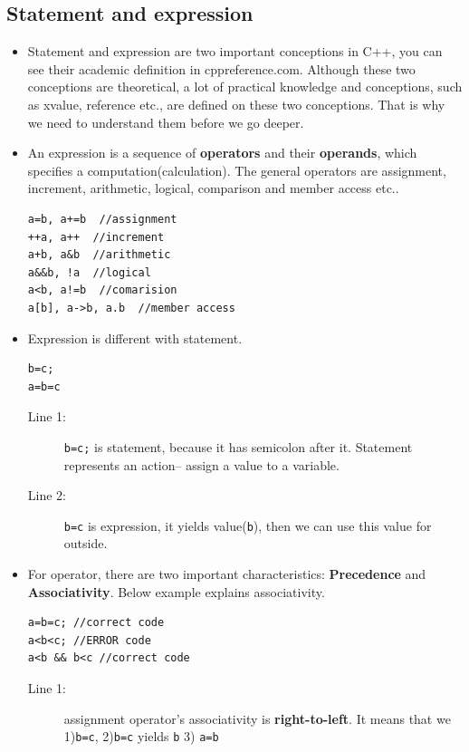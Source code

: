 \documentclass[a4paper,11pt,twoside]{book}
\begin{document}
\subsection{Statement and expression}
\begin{itemize}
	\item Statement and expression are two important conceptions in C++, you can see their academic definition in cppreference.com. Although these two conceptions are theoretical, a lot of practical knowledge and conceptions, such as xvalue, reference etc., are defined on these two conceptions. That is why we need to understand them before we go deeper. 
	
	\item An expression is a sequence of \textbf{operators} and their \textbf{operands}, which specifies a computation(calculation). The general operators are assignment, increment, arithmetic, logical, comparison and member access etc..
	
\begin{lstlisting}[numbers=none]
a=b, a+=b  //assignment
++a, a++  //increment
a+b, a&b  //arithmetic
a&&b, !a  //logical
a<b, a!=b  //comarision
a[b], a->b, a.b  //member access
\end{lstlisting}
	
	\item Expression is different with statement. 
\begin{lstlisting} 
b=c;
a=b=c
\end{lstlisting}
\begin{description}
	\item[Line 1:] \texttt{b=c;} is statement, because it has semicolon after it. Statement represents an action-- assign a value to a variable.
	
	\item[Line 2:] \texttt{b=c} is expression, it yields value(\texttt{b}), then we can use this value for outside.
\end{description}


	\item For operator, there are two important characteristics: \textbf{Precedence} and \textbf{Associativity}. Below example explains associativity. 
	
\begin{lstlisting}
a=b=c; //correct code
a<b<c; //ERROR code
a<b && b<c //correct code
\end{lstlisting}

\begin{description}
	\item[Line 1:] assignment operator's associativity is \textbf{right-to-left}. It means that we 1)\texttt{b=c}, 2)\texttt{b=c} yields \texttt{b} 3) \texttt{a=b} 
	

\end{description}
\end{itemize}
\end{document}
